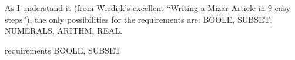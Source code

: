 \begin{remark}
As I understand it (from Wiedijk's excellent ``Writing a Mizar Article
in 9 easy steps''), the only possibilities for the {\Tt{}requirements\nwendquote} are:
{\Tt{}BOOLE\nwendquote}, {\Tt{}SUBSET\nwendquote}, {\Tt{}NUMERALS\nwendquote}, {\Tt{}ARITHM\nwendquote}, {\Tt{}REAL\nwendquote}.
\end{remark}

\nwenddocs{}\endmoddef\nwstartdeflinemarkup{}\nwenddeflinemarkup
requirements BOOLE, SUBSET

\nwendcode{}\nwdocspar

\nwenddocs{}

